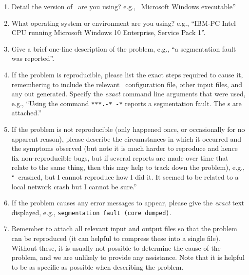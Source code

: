 \begin{enumerate}
\item Detail the version of \CNAME\ are you using? e.g., \CNAME\ \VER Microsoft Windows executable''

\item What operating system or environment are you using? e.g., ``IBM-PC Intel CPU running Microsoft Windows 10 Enterprise, Service Pack 1''.

\item Give a brief one-line description of the problem, e.g., ``a segmentation fault was reported''.

\item If the problem is reproducible, please list the exact steps required to cause it, remembering to include the relevant \CNAME\ configuration file, other input files, and any out generated. Specify the \emph{exact} command line arguments that were used, e.g., ``Using the command \texttt{***.-* -*} reports a segmentation fault. The \config s are attached.''

\item If the problem is not reproducible (only happened once, or occasionally for no apparent reason), please describe the circumstances in which it occurred and the symptoms observed (but note it is much harder to reproduce and hence fix non-reproducible bugs, but if several reports are made over time that relate to the same thing, then this may help to track down the problem), e.g., ``\CNAME\ crashed, but I cannot reproduce how I did it. It seemed to be related to a local network crash but I cannot be sure.''

\item If the problem causes any error messages to appear, please give the \emph{exact} text displayed, e.g., \texttt{segmentation fault (core dumped)}.

\item Remember to attach all relevant input and output files so that the problem can be reproduced (it can helpful to compress these into a single file). Without these, it is usually not possible to determine the cause of the problem, and we are unlikely to provide any assistance. Note that it is helpful to be as specific as possible when describing the problem.

\end{enumerate}
